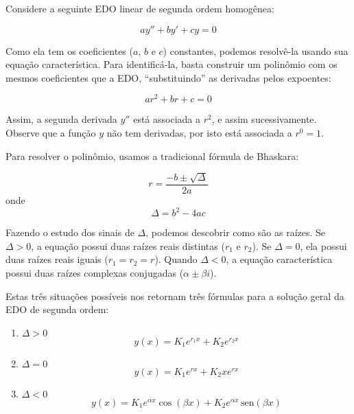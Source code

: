 \documentclass[a4paper]{article}
\providecommand{\sin}{} \renewcommand{\sin}{\hspace{2pt}\mathrm{sen}}
\begin{document}
Considere a seguinte EDO linear de segunda ordem homogênea:

\begin{displaymath}
  ay'' + by' + cy =0
\end{displaymath}

Como ela tem os coeficientes ($a$, $b$ e $c$) constantes, podemos
resolvê-la usando sua equação característica. Para identificá-la,
basta construir um polinômio com os mesmos coeficientes que a EDO,
``substituindo'' as derivadas pelos expoentes:

\begin{displaymath}
  ar^2 + br +c=0
\end{displaymath}

Assim, a segunda derivada $y''$ está associada a $r^2$, e assim
sucessivamente. Observe que a função $y$ não tem derivadas, por isto
está associada a $r^0=1$.

Para resolver o polinômio, usamos a tradicional fórmula de Bhaskara:

\begin{displaymath}
  r=\frac{-b \pm \sqrt{\Delta}}{2a}
\end{displaymath}
onde
\begin{displaymath}
  \Delta = b^2 - 4ac
\end{displaymath}

Fazendo o estudo dos sinais de $\Delta$, podemos descobrir como são as
raízes. Se $\Delta>0$, a equação possui duas raízes reais distintas
($r_1$ e $r_2$). Se $\Delta=0$, ela possui duas raízes reais iguais
($r_1=r_2=r$). Quando $\Delta<0$, a equação característica possui duas
raízes complexas conjugadas ($\alpha \pm \beta i$).

Estas três situações possíveis nos retornam três fórmulas para a
solução geral da EDO de segunda ordem:

\begin{enumerate}
\item $\Delta>0$
  \begin{displaymath}
    y(x) = K_1e^{r_1x} + K_2e^{r_2x}
  \end{displaymath}
\item $\Delta=0$
  \begin{displaymath}
    y(x) = K_1e^{rx} + K_2xe^{rx}
  \end{displaymath}
\item $\Delta<0$
  \begin{displaymath}
    y(x) = K_1e^{\alpha x}\cos(\beta x) + K_2e^{\alpha x}\sin(\beta x)
  \end{displaymath}
\end{enumerate}
\end{document}
